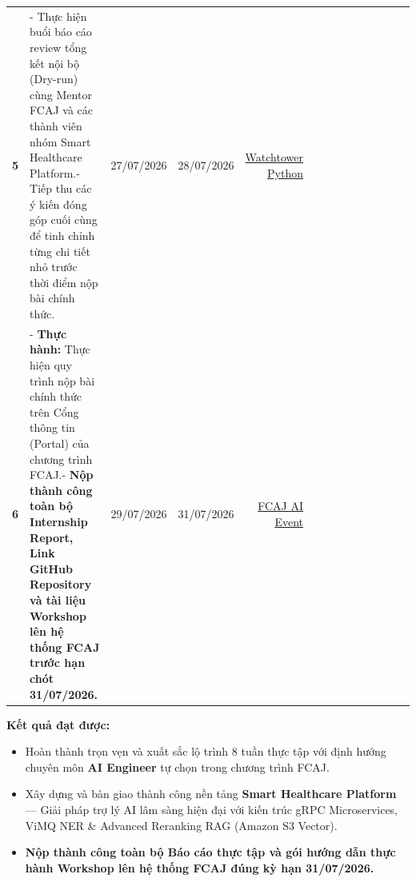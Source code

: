 \begin{longtable}[]
{CloudWatch Logs} \\
\textbf{5} & - Thực hiện buổi báo cáo review tổng kết nội bộ (Dry-run)
cùng Mentor FCAJ và các thành viên nhóm Smart Healthcare Platform.- Tiếp
thu các ý kiến đóng góp cuối cùng để tinh chỉnh từng chi tiết nhỏ trước
thời điểm nộp bài chính thức. & 27/07/2026 & 28/07/2026 &
\href{https://github.com/kislyuk/watchtower}{Watchtower Python} \\
\textbf{6} & - \textbf{Thực hành:} Thực hiện quy trình nộp bài chính
thức trên Cổng thông tin (Portal) của chương trình FCAJ.- \textbf{Nộp
thành công toàn bộ Internship Report, Link GitHub Repository và tài liệu
Workshop lên hệ thống FCAJ trước hạn chót 31/07/2026.} & 29/07/2026 &
31/07/2026 & \href{https://fcaj-event.aws.dev/}{FCAJ AI Event} \\
\end{longtable}
\endgroup

\vspace{0.5em}\noindent\textbf{Kết quả đạt được:}

\begin{itemize}
\tightlist
\item
  Hoàn thành trọn vẹn và xuất sắc lộ trình 8 tuần thực tập với định
  hướng chuyên môn \textbf{AI Engineer} tự chọn trong chương trình FCAJ.
\item
  Xây dựng và bàn giao thành công nền tảng \textbf{Smart Healthcare
  Platform} --- Giải pháp trợ lý AI lâm sàng hiện đại với kiến trúc gRPC
  Microservices, ViMQ NER \& Advanced Reranking RAG (Amazon S3 Vector).
\item
  \textbf{Nộp thành công toàn bộ Báo cáo thực tập và gói hướng dẫn thực
  hành Workshop lên hệ thống FCAJ đúng kỳ hạn 31/07/2026.}
\end{itemize}
